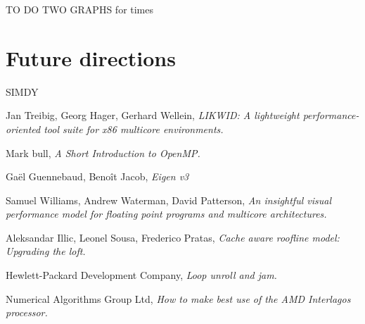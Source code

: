 \documentclass[11pt,a4paper,oneside,titlepage,openright]{book}
\begin{document}
TO DO TWO GRAPHS for times 

\chapter{Future directions}
SIMDY 
\begin{thebibliography}{1}

Jan Treibig, Georg Hager, Gerhard Wellein, \textit{LIKWID: A lightweight performance-oriented tool suite for x86 multicore environments.}
 
Mark bull, \textit{A Short Introduction to OpenMP.}

Ga\"{e}l Guennebaud, Beno\^{i}t Jacob, \textit{Eigen v3}

Samuel Williams, Andrew Waterman, David Patterson, \textit{An insightful visual performance model for floating point programs and multicore architectures.}

Aleksandar Illic, Leonel Sousa, Frederico Pratas, \textit{Cache aware roofline model: Upgrading the loft.}

Hewlett-Packard Development Company, \textit{Loop unroll and jam.}

Numerical Algorithms Group Ltd, \textit{How to make best use of the AMD Interlagos processor.}
\end{thebibliography}
 
\end{document}
